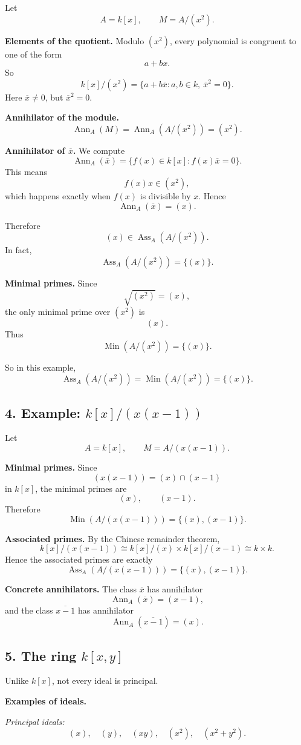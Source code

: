 \documentclass[12pt,a4paper]{article}
\theoremstyle{notespace}
\DeclareMathOperator{\Ass}{Ass}
\DeclareMathOperator{\Ann}{Ann}
\DeclareMathOperator{\Min}{Min}
\begin{document}
Let
\[
A=k[x],\qquad M=A/(x^2).
\]

\textbf{Elements of the quotient.}
Modulo \((x^2)\), every polynomial is congruent to one of the form
\[
a+bx.
\]
So
\[
k[x]/(x^2)=\{a+b\overline x:a,b\in k,\ \overline x^2=0\}.
\]
Here \(\overline x\neq 0\), but \(\overline x^2=0\).

\textbf{Annihilator of the module.}
\[
\Ann_A(M)=\Ann_A(A/(x^2))=(x^2).
\]

\textbf{Annihilator of \(\overline x\).}
We compute
\[
\Ann_A(\overline x)=\{f(x)\in k[x]:f(x)\overline x=0\}.
\]
This means
\[
f(x)x\in (x^2),
\]
which happens exactly when \(f(x)\) is divisible by \(x\). Hence
\[
\Ann_A(\overline x)=(x).
\]

Therefore
\[
(x)\in \Ass_A(A/(x^2)).
\]
In fact,
\[
\Ass_A(A/(x^2))=\{(x)\}.
\]

\textbf{Minimal primes.}
Since
\[
\sqrt{(x^2)}=(x),
\]
the only minimal prime over \((x^2)\) is
\[
(x).
\]
Thus
\[
\Min(A/(x^2))=\{(x)\}.
\]

So in this example,
\[
\Ass_A(A/(x^2))=\Min(A/(x^2))=\{(x)\}.
\]

\subsection{4. Example: \(k[x]/(x(x-1))\)}

Let
\[
A=k[x],\qquad M=A/(x(x-1)).
\]

\textbf{Minimal primes.}
Since
\[
(x(x-1))=(x)\cap (x-1)
\]
in \(k[x]\), the minimal primes are
\[
(x),\qquad (x-1).
\]
Therefore
\[
\Min(A/(x(x-1)))=\{(x),(x-1)\}.
\]

\textbf{Associated primes.}
By the Chinese remainder theorem,
\[
k[x]/(x(x-1))\cong k[x]/(x)\times k[x]/(x-1)\cong k\times k.
\]
Hence the associated primes are exactly
\[
\Ass_A(A/(x(x-1)))=\{(x),(x-1)\}.
\]

\textbf{Concrete annihilators.}
The class \(\overline x\) has annihilator
\[
\Ann_A(\overline x)=(x-1),
\]
and the class \(\overline{x-1}\) has annihilator
\[
\Ann_A(\overline{x-1})=(x).
\]

\subsection{5. The ring \(k[x,y]\)}

Unlike \(k[x]\), not every ideal is principal.

\textbf{Examples of ideals.}

\emph{Principal ideals:}
\[
(x),\quad (y),\quad (xy),\quad (x^2),\quad (x^2+y^2).
\]
\end{document}
